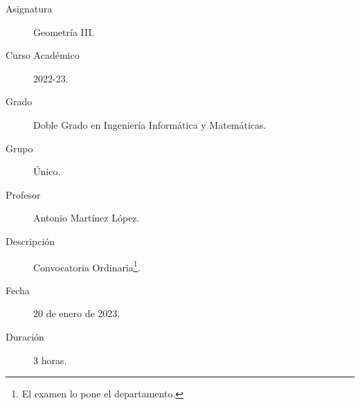 \documentclass[12pt]{article}
\begin{document}

    
    

    \begin{description}
        \item[Asignatura] Geometría III.
        \item[Curso Académico] 2022-23.
        \item[Grado] Doble Grado en Ingeniería Informática y Matemáticas.
        \item[Grupo] Único.
        \item[Profesor] Antonio Martínez López.
        \item[Descripción] Convocatoria Ordinaria\footnote{El examen lo pone el departamento.}.
        \item[Fecha] 20 de enero de 2023.
        \item[Duración] 3 horas.
    
    \end{description}
    \newpage
\end{document}
